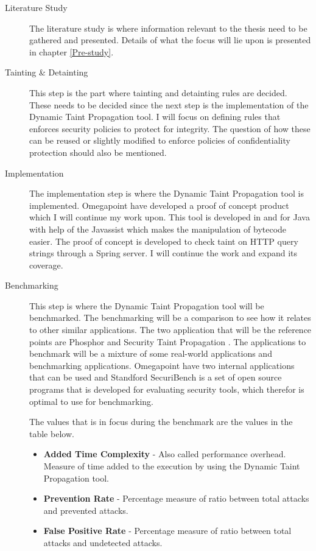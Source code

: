 \documentclass{../kththesis}
\begin{document}
	\begin{description}  
		\item [Literature Study]
		The literature study is where information relevant to the thesis need to be gathered and presented. Details of what the focus will lie upon is presented in chapter \ref{Pre-study}.
	
		\item [Tainting \& Detainting]
		This step is the part where tainting and detainting rules are decided. These needs to be decided since the next step is the implementation of the Dynamic Taint Propagation tool. I will focus on defining rules that enforces security policies to protect for integrity. The question of how these can be reused or slightly modified to enforce policies of confidentiality protection should also be mentioned.
	
		\item [Implementation]
		The implementation step is where the Dynamic Taint Propagation tool is implemented. Omegapoint have developed a proof of concept product which I will continue my work upon. This tool is developed in and for Java with help of the Javassist \parencite{Javassist} which makes the manipulation of bytecode easier. The proof of concept is developed to check taint on HTTP query strings through a Spring server. I will continue the work and expand its coverage.
	
	
		\item [Benchmarking]
		This step is where the Dynamic Taint Propagation tool will be benchmarked. The benchmarking will be a comparison to see how it relates to other similar applications. The two application that will be the reference points are Phosphor \parencite{phosphor} and Security Taint Propagation \parencite{securityTaint}. The applications to benchmark will be a mixture of some real-world applications and benchmarking applications. Omegapoint have two internal applications that can be used and Standford SecuriBench \parencite{securiBench} is a set of open source programs that is developed for evaluating security tools, which therefor is optimal to use for benchmarking.
		
		The values that is in focus during the benchmark are the values in the table below. 
		
		\begin{itemize}  
			\item \textbf{Added Time Complexity} - Also called performance overhead. Measure of time added to the execution by using the Dynamic Taint Propagation tool.
			\item \textbf{Prevention Rate} - Percentage measure of ratio between total attacks and prevented attacks.
			\item \textbf{False Positive Rate} - Percentage measure of ratio between total attacks and undetected attacks.
		\end{itemize}
	

\end{description}
\end{document}
